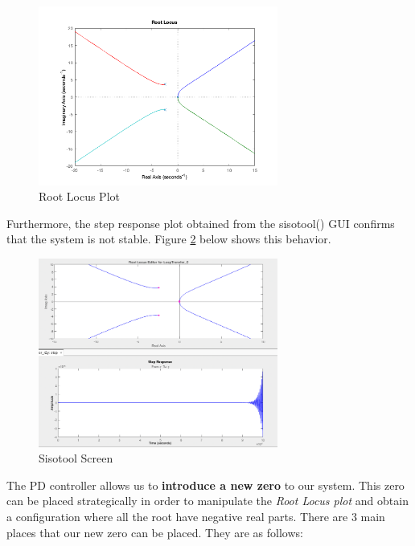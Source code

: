 \begin{figure}[H]
    \centering
    \includegraphics[width=0.7\textwidth]{images/initial_rlocus.png}
    \caption{Root Locus Plot}
    \label{fig:initial_locus}
\end{figure}


Furthermore, the step response plot obtained from the sisotool() GUI confirms that the system is not stable. Figure \ref{fig:siso1} below shows this behavior.

\begin{figure}[H]
    \centering
    \includegraphics[width=0.7\textwidth]{images/siso1.png}
    \caption{Sisotool Screen}
    \label{fig:siso1}
\end{figure}

\newpage

The PD controller allows us to \textbf{introduce a new zero} to our system. This zero can be placed strategically in order to manipulate the \textit{Root Locus plot} and obtain a configuration where all the root have negative real parts. There are 3 main places that our new zero can be placed. They are as follows:




